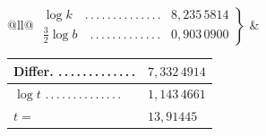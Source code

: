 \begin{center}
\footnotesize
\begin{tabular}{@{}ll@{}}
$\left.\begin{array}{ll}
\log k\quad .\,.\,.\,.\,.\,.\,.\,.\,.\,.\,.\,.\,.\,. &8{,}235\,5814\\[.3em]
\frac{3}{2}\log b\quad .\,.\,.\,.\,.\,.\,.\,.\,.\,.\,.\,.\,. &0{,}903\,0900
\end{array}\right\}$ & \begin{tabular}{@{}ll@{}}
Differ. .\,.\,.\,.\,.\,.\,.\,.\,.\,.\,.\,.\,. & $7{,}332\,4914$\\[.3em]
\hline
$\log t$ .\,.\,.\,.\,.\,.\,.\,.\,.\,.\,.\,.\,.\,. & $1{,}143\,4661$\\[.3em]
$t=$ & $13{,}91445$
\end{tabular}
\end{tabular}
\end{center}
